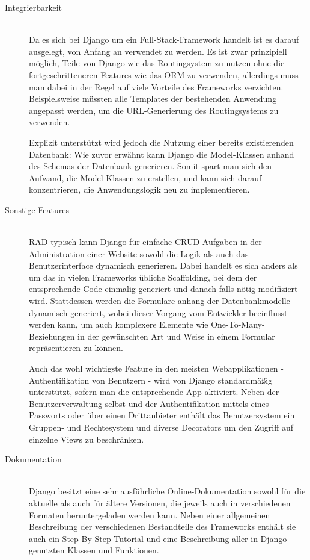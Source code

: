 \begin{description}
\item[Integrierbarkeit] \hfill \\
Da es sich bei Django um ein Full-Stack-Framework handelt ist es darauf ausgelegt, von Anfang an
verwendet zu werden. Es ist zwar prinzipiell möglich, Teile von Django wie das Routingsystem zu
nutzen ohne die fortgeschritteneren Features wie das ORM zu verwenden, allerdings muss man dabei in
der Regel auf viele Vorteile des Frameworks verzichten. Beispielsweise müssten alle Templates der
bestehenden Anwendung angepasst werden, um die URL-Generierung des Routingsystems zu verwenden.

Explizit unterstützt wird jedoch die Nutzung einer bereits existierenden Datenbank: Wie zuvor
erwähnt kann Django die Model-Klassen anhand des Schemas der Datenbank generieren. Somit spart man
sich den Aufwand, die Model-Klassen zu erstellen, und kann sich darauf konzentrieren, die
Anwendungslogik neu zu implementieren.


\item[Sonstige Features] \hfill \\
RAD-typisch kann Django für einfache CRUD-Aufgaben in der Administration einer Website sowohl die
Logik als auch das Benutzerinterface dynamisch generieren. Dabei handelt es sich anders als um das
in vielen Frameworks übliche Scaffolding, bei dem der entsprechende Code einmalig generiert und
danach falls nötig modifiziert wird. Stattdessen werden die Formulare anhang der Datenbankmodelle
dynamisch generiert, wobei dieser Vorgang vom Entwickler beeinflusst werden kann, um auch komplexere
Elemente wie One-To-Many-Beziehungen in der gewünschten Art und Weise in einem Formular
repräsentieren zu können.

Auch das wohl wichtigste Feature in den meisten Webapplikationen - Authentifikation von Benutzern -
wird von Django standardmäßig unterstützt, sofern man die entsprechende App aktiviert. Neben der
Benutzerverwaltung selbst und der Authentifikation mittels eines Passworts oder über einen
Drittanbieter enthält das Benutzersystem ein Gruppen- und Rechtesystem und diverse Decorators um
den Zugriff auf einzelne Views zu beschränken.


\item[Dokumentation] \hfill \\
Django besitzt eine sehr ausführliche Online-Dokumentation sowohl für die aktuelle als auch für
ältere Versionen, die jeweils auch in verschiedenen Formaten heruntergeladen werden kann. Neben
einer allgemeinen Beschreibung der verschiedenen Bestandteile des Frameworks enthält sie auch ein
Step-By-Step-Tutorial und eine Beschreibung aller in Django genutzten Klassen und Funktionen.


\end{description}
